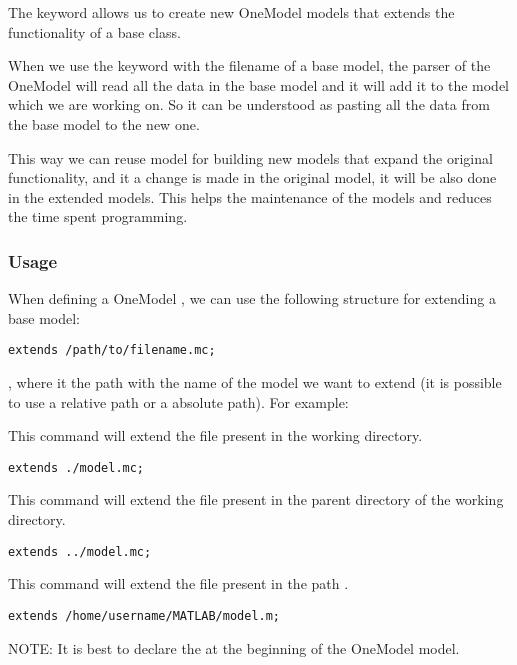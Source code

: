 \documentclass[11pt]{article}
\begin{document}
The keyword  allows us to create new OneModel models that extends the functionality of a base class.

When we use the keyword  with the filename of a base model, the parser of the OneModel will read all the data in the base model and it will add it to the model which we are working on. So it can be understood as pasting all the data from the base model to the new one.

This way we can reuse model for building new models that expand the original functionality, and it a change is made in the original model, it will be also done in the extended models. This helps the maintenance of the models and reduces the time spent programming.

\subsubsection{Usage}

When defining a OneModel , we can use the following structure for extending a base model:

\begin{lstlisting}
extends /path/to/filename.mc;
\end{lstlisting}

, where  it the path with the name of the model we want to extend (it is possible to use a relative path or a absolute path). For example:

This command will extend the file  present in the working directory.

\begin{lstlisting}
extends ./model.mc;
\end{lstlisting}

This command will extend the file  present in the parent directory of the working directory.

\begin{lstlisting}
extends ../model.mc;
\end{lstlisting}

This command will extend the file  present in the path .

\begin{lstlisting}
extends /home/username/MATLAB/model.m;
\end{lstlisting}

NOTE: It is best to declare the  at the beginning of the OneModel model.
\end{document}
